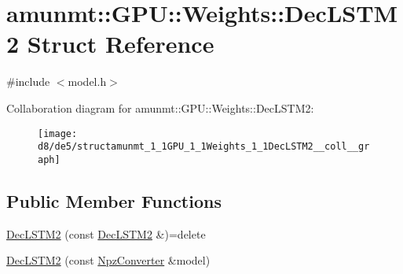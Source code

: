 \hypertarget{structamunmt_1_1GPU_1_1Weights_1_1DecLSTM2}{}\section{amunmt\+:\+:G\+PU\+:\+:Weights\+:\+:Dec\+L\+S\+T\+M2 Struct Reference}
\label{structamunmt_1_1GPU_1_1Weights_1_1DecLSTM2}


{\ttfamily \#include $<$model.\+h$>$}



Collaboration diagram for amunmt\+:\+:G\+PU\+:\+:Weights\+:\+:Dec\+L\+S\+T\+M2\+:
\nopagebreak
\begin{figure}[H]
\begin{center}
\leavevmode
\texttt{[image: d8/de5/structamunmt\_1\_1GPU\_1\_1Weights\_1\_1DecLSTM2\_\_coll\_\_graph]}
\end{center}
\end{figure}
\subsection*{Public Member Functions}
\begin{DoxyCompactItemize}
\item 
\hyperlink{structamunmt_1_1GPU_1_1Weights_1_1DecLSTM2_a50066d2b4b659953df4ffcb34f6e09ee}{Dec\+L\+S\+T\+M2} (const \hyperlink{structamunmt_1_1GPU_1_1Weights_1_1DecLSTM2}{Dec\+L\+S\+T\+M2} \&)=delete
\item 
\hyperlink{structamunmt_1_1GPU_1_1Weights_1_1DecLSTM2_ad79e1abaf68c15eca764fa2ca009a00d}{Dec\+L\+S\+T\+M2} (const \hyperlink{classamunmt_1_1GPU_1_1NpzConverter}{Npz\+Converter} \&model)
\end{DoxyCompactItemize}

